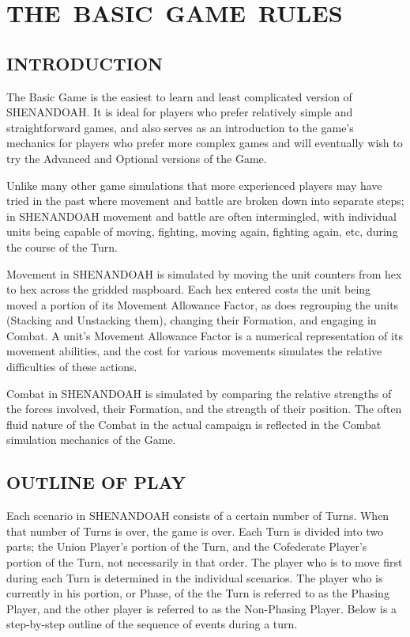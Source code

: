 \section{\mbox{\large THE BASIC GAME RULES}}

\subsection{INTRODUCTION}

The Basic Game is the easiest to learn and least complicated version of SHENANDOAH. It is ideal for players who prefer relatively simple and straightforward games, and also serves as an introduction to the game's mechanics for players who prefer more complex games and will eventually wish to try the Advanced and Optional versions of the Game.

Unlike many other game simulations that more experienced players may have tried in the past where movement and battle are broken down into separate steps; in SHENANDOAH movement and battle are often intermingled, with individual units being capable of moving, fighting, moving again, fighting again, etc, during the course of the Turn.

Movement in SHENANDOAH is simulated by moving the unit counters from hex to hex across the gridded mapboard. Each hex entered costs the unit being moved a portion of its Movement Allowance Factor, as does regrouping the units (Stacking and Unstacking them), changing their Formation, and engaging in Combat. A unit's Movement Allowance Factor is a numerical representation of its movement abilities, and the cost for various movements simulates the relative difficulties of these actions.

Combat in SHENANDOAH is simulated by comparing the relative strengths of the forces involved, their Formation, and the strength of their position. The often fluid nature of the Combat in the actual campaign is reflected in the Combat simulation mechanics of the Game.

\subsection{OUTLINE OF PLAY}

Each scenario in SHENANDOAH consists of a certain number of Turns. When that number of Turns is over, the game is over. Each Turn is divided into two parts; the Union Player's portion of the Turn, and the Cofederate Player's portion of the Turn, not necessarily in that order. The player who is to move first during each Turn is determined in the individual scenarios. The player who is currently in his portion, or Phase, of the the Turn is referred to as the Phasing Player, and the other player is referred to as the Non-Phasing Player. Below is a step-by-step outline of the sequence of events during a turn.

